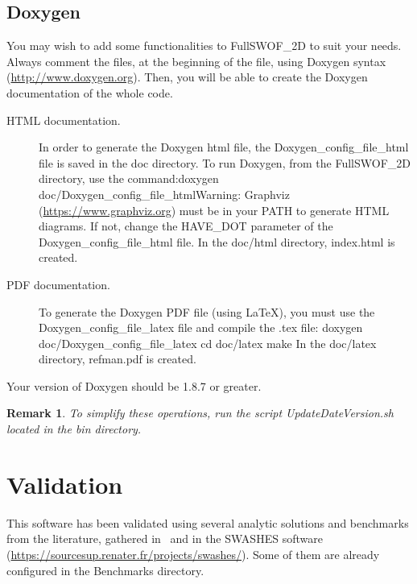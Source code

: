 \documentclass[a4paper, 11pt]{article}
\newcommand{\FullSWOF}{FullSWOF\_2D}
\newtheorem{rmk}{Remark}
\begin{document}
\subsection{Doxygen}

You may wish to add some functionalities to \FullSWOF{} to suit your needs.
Always comment the files, at the beginning of the file, using Doxygen syntax (\url{http://www.doxygen.org}).
Then, you will be able to create the Doxygen documentation of the whole code.
\begin{description}
	\item[HTML documentation.]
	      \sloppy In order to generate the Doxygen html file, the \textsf{Doxygen\_config\_file\_html} file is saved in the \textsf{doc} directory.
	      To run Doxygen, from the \FullSWOF{} directory, use the command:\newline \textsf{doxygen doc/Doxygen\_config\_file\_html}\newline Warning: Graphviz (\url{https://www.graphviz.org}) must be in your PATH to generate HTML diagrams.
	      If not, change the HAVE\_DOT parameter of the \textsf{Doxygen\_config\_file\_html} file.
	      In the \textsf{doc/html} directory, \textsf{index.html} is created.
	\item[PDF documentation.]
	      To generate the Doxygen PDF file (using \LaTeX{}), you must use the \textsf{Doxygen\_config\_file\_latex} file and compile the \textsf{.tex} file:\newline
	      \textsf{doxygen doc/Doxygen\_config\_file\_latex}\newline
	      \textsf{cd doc/latex}\newline
	      \textsf{make}\newline
	      In the \textsf{doc/latex} directory, \textsf{refman.pdf} is created.
\end{description}
Your version of Doxygen should be 1.8.7 or greater.

\begin{rmk}
	To simplify these operations, run the script \textnormal{\textsf{UpdateDateVersion.sh}} located in the \textnormal{\textsf{bin}} directory.
\end{rmk}

\section{Validation}\label{sec:valid}

This software has been validated using several analytic solutions and benchmarks from the literature, gathered in~\citet{Delestre13} and in the SWASHES software (\url{https://sourcesup.renater.fr/projects/swashes/}).
Some of them are already configured in the \textsf{Benchmarks} directory.
\end{document}
